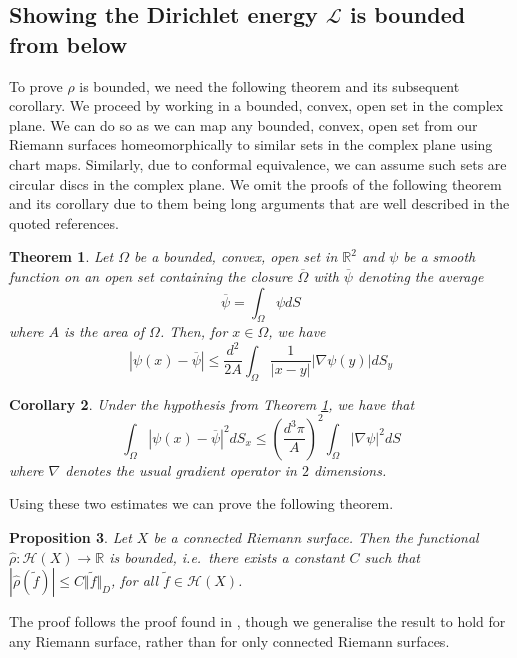 \documentclass[11pt]{report}
\newtheorem{thm}{Theorem}[section]
\newtheorem{prop}[thm]{Proposition}
\newtheorem{cor}[thm]{Corollary}
\theoremstyle{definition}
\begin{document}
\subsection{Showing the Dirichlet energy $\mathcal{L}$ is bounded from below}
To prove $\hat{\rho}$ is bounded, we need the following theorem and its subsequent corollary. We proceed by working in a bounded, convex, open set in the complex plane. We can do so as we can map any bounded, convex, open set from our Riemann surfaces homeomorphically to similar sets in the complex plane using chart maps. Similarly, due to conformal equivalence, we can assume such sets are circular discs in the complex plane. We omit the proofs of the following theorem and its corollary due to them being long arguments that are well described in the quoted references.
\begin{thm}\cite[Theorem 11]{donaldson}\label{quotedTheorem11}
  Let $\Omega$ be a bounded, convex, open set in $\mathbb{R}^2$ and $\psi$ be a smooth function on an open set containing the closure $\overline{\Omega}$ with $\overline{\psi}$ denoting the average 
  \[\overline{\psi} = \int_{\Omega}\psi dS\] 
  where $A$ is the area of $\Omega$. Then, for $x \in \Omega$, we have 
  \[|\psi(x) - \overline{\psi}| \leq \frac{d^2}{2A}\int_\Omega \frac{1}{|x - y|}|\nabla\psi(y)|dS_y\]
\end{thm}
\begin{cor}\cite[Corollary 6]{donaldson}\label{quotedCorollary6}
  Under the hypothesis from Theorem \ref{quotedTheorem11}, we have that 
  \[\int_\Omega |\psi(x) - \overline{\psi}|^2 dS_x\leq \left(\frac{d^3\pi}{A}\right)^2\int_\Omega |\nabla\psi|^2 dS\]
  where $\nabla$ denotes the usual gradient operator in $2$ dimensions.
\end{cor}
Using these two estimates we can prove the following theorem.
\begin{prop}\label{PartitionOfUnity}
  Let $X$ be a connected Riemann surface. Then the functional $\hat{\rho}:\mathcal{H}(X) \rightarrow \mathbb{R}$ is bounded, i.e.\ there exists a constant $C$ such that $|\hat{\rho}(\tilde{f})|  \leq C \Vert \tilde{f} \Vert_D$, for all $\tilde{f} \in \mathcal{H}(X)$.
\end{prop}
The proof follows the proof found in \cite[p.125]{donaldson}, though we generalise the result to hold for any Riemann surface, rather than for only connected Riemann surfaces.
\end{document}
